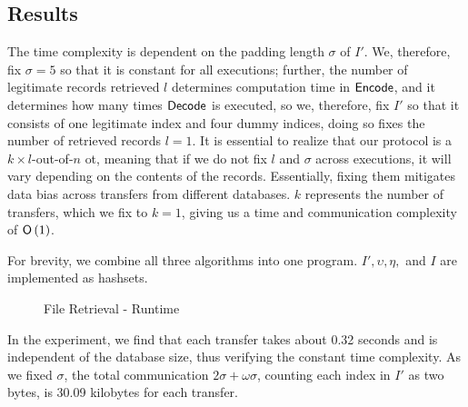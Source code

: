 \subsection*{\thesubsection\quad Results}\label{subsec:RetrievalResults}

The time complexity is dependent on the padding length $ \sigma $ of  $ I' $. We, therefore, fix $ \sigma = 5 $ so that it is constant for all executions; further, the number of legitimate records retrieved $ l $ determines computation time in $ \mathsf{{Encode}} $, and it determines how many times $ \mathsf{{Decode}} $ is executed, so we, therefore, fix $ I' $ so that it consists of one legitimate index and four dummy indices, doing so fixes the number of retrieved records $ l = 1 $. It is essential to realize that our protocol is a $ k \times l $-out-of-$ n $ \acrshort{ot}, meaning that if we do not fix $ l $ and $ \sigma $ across executions, it will vary depending on the contents of the records. Essentially, fixing them mitigates data bias across transfers from different databases. $ k $ represents the number of transfers, which we fix to $ k = 1 $, giving us a time and communication complexity of $ \mathsf{{O}} \left( 1 \right) $.

For brevity, we combine all three algorithms into one program. $ I', \upsilon, \eta, $ and $ I $ are implemented as hashsets.

\begin{figure}[H]
    \caption{File Retrieval - Runtime}
    \label{fig:fileRetrievalRuntime}
    \centering
\end{figure}

In the experiment, we find that each transfer takes about 0.32 seconds and is independent of the database size, thus verifying the constant time complexity. As we fixed $ \sigma $, the total communication $ 2\sigma + \omega \sigma $, counting each index in $ I' $ as two bytes, is 30.09 kilobytes for each transfer.

